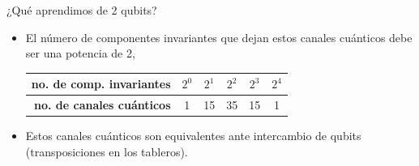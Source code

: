 \documentclass[11pt,xcolor=dvipsnames]{beamer}
\begin{document}
\begin{frame}{\Large ¿Qué aprendimos de 2 qubits?}
	
	\begin{itemize}[label=$\textcolor{Blue}{\blacktriangleright}$]
		\item<2-> El número de componentes invariantes que dejan estos canales 
							cuánticos debe ser una potencia de 2,
		\only<2>{\vspace{1cm}}
			\only<3->
			{
			\vspace{1mm}
			\scriptsize{
			\begin{center}
			\begin{tabular}{r|c|c|c|c|c}
			\textbf{no. de comp. invariantes} & $2^0$ & $2^1$ & $2^2$ & $2^3$ & $2^4$ \\ 
			\hline 
			\textbf{no. de canales cuánticos} & 1 & 15 & 35 & 15 & 1 \\ 
			\end{tabular} 
			\end{center}
			}}
					
		\item<4-> Estos canales cuánticos son equivalentes ante intercambio de 
							qubits (transposiciones en los tableros).
					

\end{itemize}
\end{frame}
\end{document}
